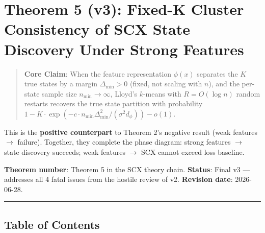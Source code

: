 \documentclass[
  12pt,
]{article}
\author{SCX}
\date{2026}
\begin{document}
\section{Theorem 5 (v3): Fixed-K Cluster Consistency of SCX State
Discovery Under Strong
Features}\label{theorem-5-v3-fixed-k-cluster-consistency-of-scx-state-discovery-under-strong-features}

\begin{quote}
\textbf{Core Claim}: When the feature representation \(\phi(x)\)
separates the \(K\) true states by a margin \(\Delta_{\min} > 0\)
(fixed, not scaling with \(n\)), and the per-state sample size
\(n_{\min} \to \infty\), Lloyd's \(k\)-means with \(R = O(\log n)\)
random restarts recovers the true state partition with probability
\(1 - K \cdot \exp(-c \cdot n_{\min} \Delta_{\min}^2 / (\sigma^2 d_\phi)) - o(1)\).
\end{quote}

This is the \textbf{positive counterpart} to Theorem 2's negative result
(weak features \(\to\) failure). Together, they complete the phase
diagram: strong features \(\to\) state discovery succeeds; weak features
\(\to\) SCX cannot exceed loss baseline.

\textbf{Theorem number}: Theorem 5 in the SCX theory chain.
\textbf{Status}: Final v3 --- addresses all 4 fatal issues from the
hostile review of v2. \textbf{Revision date}: 2026-06-28.

\begin{center}\rule{0.5\linewidth}{0.5pt}\end{center}

\subsection{Table of Contents}\label{table-of-contents}
\end{document}
